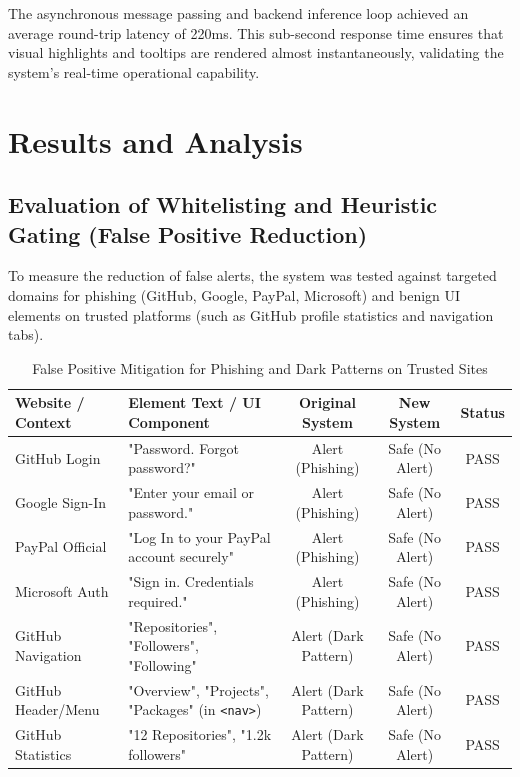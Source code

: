 \documentclass[12pt,a4paper]{report}
\begin{document}
The asynchronous message passing and backend inference loop achieved an average round-trip latency of 220ms. This sub-second response time ensures that visual highlights and tooltips are rendered almost instantaneously, validating the system's real-time operational capability.

\section{Results and Analysis}

\subsection{Evaluation of Whitelisting and Heuristic Gating (False Positive Reduction)}
To measure the reduction of false alerts, the system was tested against targeted domains for phishing (GitHub, Google, PayPal, Microsoft) and benign UI elements on trusted platforms (such as GitHub profile statistics and navigation tabs).

\begin{table}[H]
\centering
\caption{False Positive Mitigation for Phishing and Dark Patterns on Trusted Sites}
\vspace{0.1cm}
\renewcommand{\arraystretch}{1.2}
\begin{tabular}{|l|p{6cm}|c|c|c|}
\hline
\textbf{Website / Context} & \textbf{Element Text / UI Component} & \textbf{Original System} & \textbf{New System} & \textbf{Status} \\
\hline
GitHub Login & "Password. Forgot password?" & Alert (Phishing) & Safe (No Alert) & PASS \\
\hline
Google Sign-In & "Enter your email or password." & Alert (Phishing) & Safe (No Alert) & PASS \\
\hline
PayPal Official & "Log In to your PayPal account securely" & Alert (Phishing) & Safe (No Alert) & PASS \\
\hline
Microsoft Auth & "Sign in. Credentials required." & Alert (Phishing) & Safe (No Alert) & PASS \\
\hline
GitHub Navigation & "Repositories", "Followers", "Following" & Alert (Dark Pattern) & Safe (No Alert) & PASS \\
\hline
GitHub Header/Menu & "Overview", "Projects", "Packages" (in \texttt{<nav>}) & Alert (Dark Pattern) & Safe (No Alert) & PASS \\
\hline
GitHub Statistics & "12 Repositories", "1.2k followers" & Alert (Dark Pattern) & Safe (No Alert) & PASS \\
\hline
\end{tabular}
\end{table}
\end{document}
